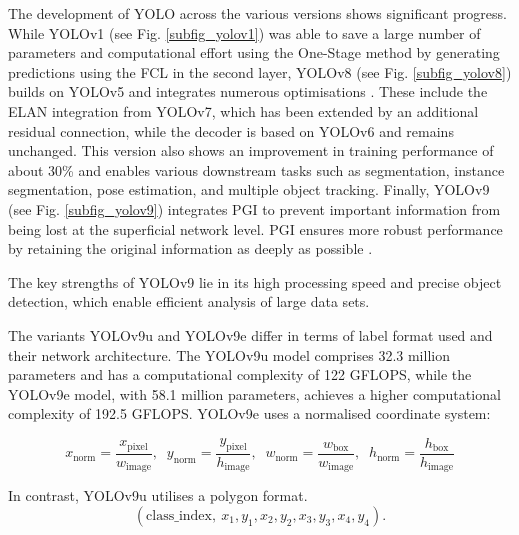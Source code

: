 The development of \acrshort{YOLO} across the various versions shows significant progress. While \acrshort{YOLO}v1 (see Fig. \ref{subfig_yolov1}) was able to save a large number of parameters and computational effort using the One-Stage method by generating predictions using the \acrshort{FCL} in the second layer, \acrshort{YOLO}v8 (see Fig. \ref{subfig_yolov8}) builds on \acrshort{YOLO}v5 and integrates numerous optimisations \cite{Wang2024_yolo_review}. These include the \acrfull{ELAN} integration from \acrshort{YOLO}v7, which has been extended by an additional residual connection, while the decoder is based on \acrshort{YOLO}v6 and remains unchanged. This version also shows an improvement in training performance of about 30\% and enables various downstream tasks such as segmentation, instance segmentation, pose estimation, and multiple object tracking. Finally, \acrshort{YOLO}v9 (see Fig. \ref{subfig_yolov9}) integrates \acrshort{PGI} to prevent important information from being lost at the superficial network level. \acrshort{PGI} ensures more robust performance by retaining the original information as deeply as possible \cite{Wang2024_yolo_review}.

The key strengths of \acrshort{YOLO}v9 lie in its high processing speed and precise object detection, which enable efficient analysis of large data sets.
 
The variants \acrshort{YOLO}v9u and \acrshort{YOLO}v9e differ in terms of label format used and their network architecture. The \acrshort{YOLO}v9u model comprises 32.3 million parameters and has a computational complexity of 122 GFLOPS, while the \acrshort{YOLO}v9e model, with 58.1 million parameters, achieves a higher computational complexity of 192.5 GFLOPS. \acrshort{YOLO}v9e uses a normalised coordinate system:

\hypertarget{eq:yolov9}{}
\begin{equation}
x_\text{norm} = \frac{x_\text{pixel}}{w_\text{image}},\;\;
y_\text{norm} = \frac{y_\text{pixel}}{h_\text{image}},\;\;
w_\text{norm} = \frac{w_\text{box}}{w_\text{image}},\;\;
h_\text{norm} = \frac{h_\text{box}}{h_\text{image}}
\end{equation}
\label{Eq:yolov9}

\hypertarget{eq:yolov9u}{}
In contrast, \acrshort{YOLO}v9u utilises a polygon format.
\begin{equation}
(\text{class\_index},\ x_1, y_1, x_2, y_2, x_3, y_3, x_4, y_4).
\end{equation}




